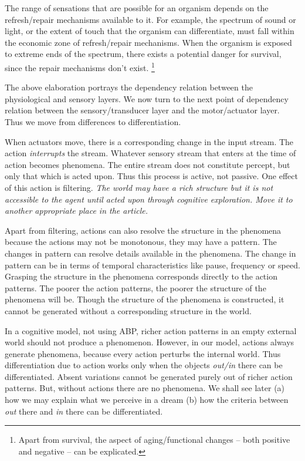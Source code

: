 The range of sensations that are possible for an organism depends on the refresh/repair mechanisms available to it. For example, the spectrum of sound or light, or the extent of touch that the organism can differentiate, must fall within the economic zone of refresh/repair mechanisms. When the organism is exposed to extreme ends of the spectrum, there exists a potential danger for survival, since the repair mechanisms don't exist. \footnote{Apart from survival, the aspect of aging/functional changes – both positive and negative – can be explicated.}

The above elaboration portrays the dependency relation between the physiological and sensory layers. We now turn to the next point of dependency relation between the sensory/transducer layer and the motor/actuator layer. Thus we move from differences to differentiation. 

When actuators move, there is a corresponding change in the input stream. The action \textit{interrupts} the stream. Whatever sensory stream that enters at the time of action becomes phenomena. The entire stream does not constitute percept, but only that which is acted upon. Thus this process is active, not passive. One effect of this action is filtering. \emph{The world may have a rich structure but it is not accessible to the agent until acted upon through cognitive exploration. Move it to another appropriate place in the article.}

Apart from filtering, actions can also resolve the structure in the phenomena because the actions may not be monotonous, they may have a pattern. The changes in pattern can resolve details available in the phenomena. The change in pattern can be in terms of temporal characteristics like pause, frequency or speed. Grasping the structure in the phenomena corresponds directly to the action patterns. The poorer the action patterns, the poorer the structure of the phenomena will be. Though the structure of the phenomena is constructed, it cannot be generated without a corresponding structure in the world. 

In a cognitive model, not using ABP, richer action patterns in an empty external world should not produce a phenomenon. However, in our model, actions always generate phenomena, because every action perturbs the internal world. Thus differentiation due to action works only when the objects \textit{out/in} there can be differentiated. Absent variations cannot be generated purely out of richer action patterns.  But, without actions there are no phenomena. We shall see later (a) how we may explain what we perceive in a dream (b) how the criteria between \textit{out} there and \textit{in} there can be differentiated. 

